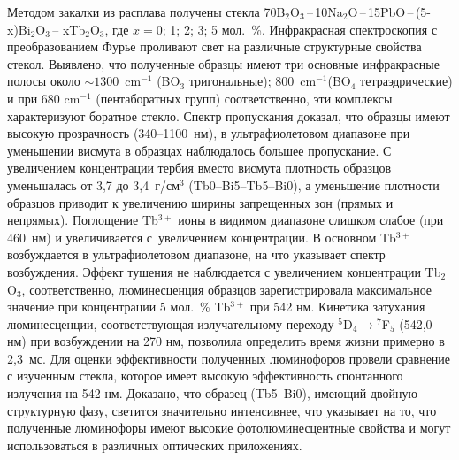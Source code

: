 \documentclass[press]{vestnik}
\begin{document}
Методом закалки из расплава получены стекла 70B$_{2}$O$_{3}$\,--\,10Na$_{2}$O\,--\,15PbO\,--\,(5-x)Bi$_{2}$O$_{3}$\,-- xTb$_{2}$O$_{3}$, где $x = 0$; 1; 2; 3; 
5 мол.~{\%}. Инфракрасная спектроскопия с преобразованием Фурье проливают 
свет на различные структурные свойства стекол. Выявлено, что полученные 
образцы имеют три основные инфракрасные полосы около $\sim 1300$~cm$^{-1}$ (BO$_{3}$ тригональные); 800~cm$^{-1}$(BO$_{4}$ 
тетраэдрические) и при 680 cm$^{-1}$ (пентаборатных групп) соответственно, 
эти комплексы характеризуют боратное стекло. Спектр пропускания доказал, что 
образцы имеют высокую прозрачность (340--1100~нм), в ультрафиолетовом 
диапазоне при уменьшении висмута в образцах наблюдалось большее пропускание. 
С увеличением концентрации тербия вместо висмута плотность образцов 
уменьшалась от 3,7 до 3,4~г/см$^{3}$ (Tb0--Bi5--Tb5--Bi0), а уменьшение 
плотности образцов приводит к увеличению ширины запрещенных зон (прямых и 
непрямых). Поглощение Tb$^{3+}$ ионы в видимом диапазоне слишком слабое (при 
460~нм) и увеличивается с~увеличением концентрации. В основном Tb$^{3+}$ 
возбуждается в ультрафиолетовом диапазоне, на что указывает спектр 
возбуждения. Эффект тушения не наблюдается с увеличением концентрации 
Tb$_{2}$O$_{3}$, соответственно, люминесценция образцов зарегистрировала 
максимальное значение при концентрации 5 мол.~{\%} Tb$^{3+}$ при 542 нм. 
Кинетика затухания люминесценции, соответствующая излучательному переходу 
$^{5}$D$_{4} \to {}^{7}$F$_{5}$ (542,0 нм) при возбуждении на 270 нм, 
позволила определить время жизни примерно в 2,3~мс. Для оценки эффективности 
полученных люминофоров провели сравнение с изученным стекла, которое имеет 
высокую эффективность спонтанного излучения на 542 нм. Доказано, что образец 
(Tb5--Bi0), имеющий двойную структурную фазу, светится значительно 
интенсивнее, что указывает на то, что полученные люминофоры имеют высокие 
фотолюминесцентные свойства и могут использоваться в различных оптических 
приложениях.
\end{document}
